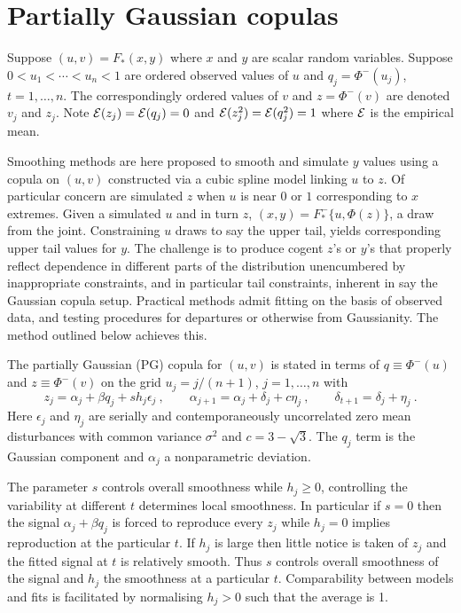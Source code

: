 \documentclass[authoryear]{elsarticle}
\newcommand{\eps}{\epsilon}
\newcommand{\Ex}{{\cal E}}
\newcommand{\cq}{\ , \qquad}
\newcommand{\be}[1]{\begin{equation}\label{#1}}
\newcommand{\ee}{\end{equation}}
\begin{document}
\section{Partially Gaussian copulas}

Suppose $(u,v)=F_*(x,y)$  where $x$ and $y$ are scalar random variables.    Suppose $0<u_1<\cdots<u_n<1$  are   ordered observed values of $u$ and $q_j=\Phi^-(u_j)$, $t=1,\ldots,n$.  The correspondingly ordered values of $v$ and $z=\Phi^-(v)$ are denoted $v_j$ and $z_j$.  Note $\Ex(z_j)=\Ex(q_j)=0$ and $\Ex(z^2_j)=\Ex(q^2_j)=1$ where $\Ex$  is the empirical mean. 

Smoothing methods are here proposed to smooth and simulate $y$ values  using a copula on $(u,v)$ constructed via    a cubic spline model linking $u$ to $z$.   Of particular concern are simulated $z$ when $u$ is  near $0$ or $1$ corresponding to  $x$ extremes.    Given a simulated $u$ and in turn $z$, $(x,y)=F^-_*\{u,\Phi(z)\}$, a draw from the joint.  Constraining $u$ draws to say the upper tail, yields corresponding upper tail values for $y$.   The challenge is to produce cogent $z$'s or $y$'s that properly reflect dependence in different parts of the distribution unencumbered by inappropriate constraints, and in particular tail constraints, inherent in say the Gaussian copula setup.    Practical methods admit fitting on the basis of observed data, and testing procedures for  departures or otherwise from Gaussianity.   The method outlined below achieves this.

The partially Gaussian  (PG) copula for $(u,v)$ is stated in terms of  $q\equiv\Phi^-(u)$ and $z\equiv\Phi^-(v)$ on the grid   $u_j=j/(n+1)$, $j=1,\ldots,n$ with 
\be{cusp}
z_j = \alpha_j+\beta q_j+ sh_j\eps_j\cq \alpha_{j+1}=\alpha_j +\delta_j+c\eta_j\cq \delta_{t+1}=\delta_j+\eta_j\ .
\ee
Here $\eps_j$ and $\eta_j$ are serially and contemporaneously uncorrelated zero mean disturbances with common variance $\sigma^2$ and $c=3-\sqrt 3$. The  $q_j$ term is the   Gaussian component and  $\alpha_j$ a nonparametric deviation.   

The parameter $s$ controls overall smoothness while  $h_j\ge 0$,  controlling the variability at different $t$ determines local smoothness.
In particular if $s=0$ then the signal $\alpha_j+\beta q_j$ is forced to reproduce every  $z_j$ while $h_j=0$ implies reproduction at the particular $t$.     If $h_j$ is large then little notice is taken of $z_j$ and the fitted signal at $t$ is relatively smooth.  Thus $s$ controls overall smoothness of the signal and  $h_j$ the smoothness at a particular $t$.  Comparability between models and fits is facilitated by normalising $h_j>0$ such that the average  is 1.  
\end{document}
